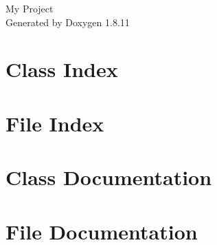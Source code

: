 \documentclass[twoside]{book}
\newcommand{\+}{\discretionary{\mbox{\scriptsize$\hookleftarrow$}}{}{}}
\newcommand{\clearemptydoublepage}{%
  \newpage{\pagestyle{empty}\cleardoublepage}%
}
\begin{document}
\hypersetup{pageanchor=false,
             bookmarksnumbered=true,
             pdfencoding=unicode
            }
\begin{titlepage}
\vspace*{7cm}
\begin{center}%
{\Large My Project }\\
\vspace*{1cm}
{\large Generated by Doxygen 1.8.11}\\
\end{center}
\end{titlepage}
\clearemptydoublepage
\tableofcontents
\clearemptydoublepage
{}
\hypersetup{pageanchor=true}

\chapter{Class Index}

\chapter{File Index}

\chapter{Class Documentation}
















\chapter{File Documentation}










\backmatter
\newpage
{}
\clearemptydoublepage
{}
\printindex
\end{document}
